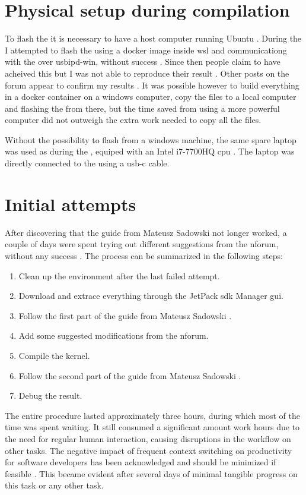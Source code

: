 \section{Physical setup during compilation}
To flash the \jx it is necessary to have a host computer running Ubuntu \cite{nvidiaSDKManager2019}.
During the \preproject I attempted to flash the \jx using a docker image inside \gls{wsl} and communicationg with the \jx over usbipd-win, without success \cite{martensPortableSensorRig2022} \cite{nvidiaSDKManager2019} \cite{dorsselaerUsbipdwin2023}.
Since then people claim to have acheived this but I was not able to reproduce their result \jx \cite{makinbacon21TUTORIALUsingSdkmanager2022}.
Other posts on the forum appear to confirm my results \cite{2008PleaseProvideMore2022}.
It was possible however to build everything in a docker container on a windows computer, copy the files to a local computer and flashing the \jx from there,
but the time saved from using a more powerful computer did not outweigh the extra work needed to copy all the files.

Without the possibility to flash from a windows machine, the same spare laptop was used as during the \preproject, equiped with an Intel i7-7700HQ \gls{cpu} \cite{martensPortableSensorRig2022}.
The laptop was directly connected to the \jx using a usb-c cable.



\section{Initial attempts}
After discovering that the guide from Mateusz Sadowski not longer worked, a couple of days were spent trying out different suggestions from the \gls{nforum}, without any success \cite{martensPortableSensorRig2022}.
The process can be summarized in the following steps:
\begin{enumerate}
    \item Clean up the environment after the last failed attempt.
    \item Download and extrace everything through the JetPack \gls{sdk} Manager gui.
    \item Follow the first part of the guide from Mateusz Sadowski \cite{sadowskiEnablingPPSJetson2020}.
    \item Add some suggested modifications from the \gls{nforum}.
    \item Compile the kernel.
    \item Follow the second part of the guide from Mateusz Sadowski \cite{sadowskiEnablingPPSJetson2020}.
    \item Debug the result.
\end{enumerate}
The entire procedure lasted approximately three hours, during which most of the time was spent waiting.
It still consumed a significant amount work hours due to the need for regular human interaction, causing disruptions in the workflow on other tasks.
The negative impact of frequent context switching on productivity for software developers has been acknowledged and should be minimized if feasible \cite{meyerSoftwareDevelopersPerceptions2014}.
This became evident after several days of minimal tangible progress on this task or any other task.

